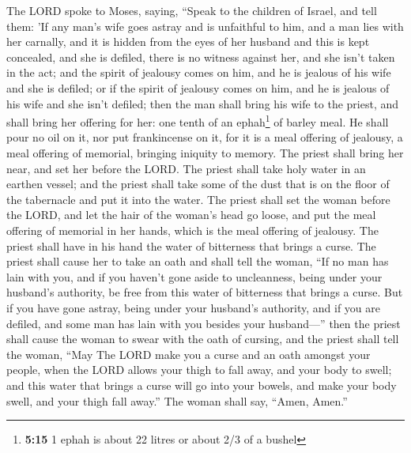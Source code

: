  The LORD spoke to Moses, saying,  ``Speak
to the children of Israel, and tell them: 'If any man's wife goes astray
and is unfaithful to him,  and a man lies with her
carnally, and it is hidden from the eyes of her husband and this is kept
concealed, and she is defiled, there is no witness against her, and she
isn't taken in the act;  and the spirit of jealousy comes
on him, and he is jealous of his wife and she is defiled; or if the
spirit of jealousy comes on him, and he is jealous of his wife and she
isn't defiled;  then the man shall bring his wife to the
priest, and shall bring her offering for her: one tenth of an
ephah\footnote{\textbf{5:15} 1 ephah is about 22 litres or about 2/3 of
  a bushel} of barley meal. He shall pour no oil on it, nor put
frankincense on it, for it is a meal offering of jealousy, a meal
offering of memorial, bringing iniquity to memory.  The
priest shall bring her near, and set her before the LORD.
 The priest shall take holy water in an earthen vessel;
and the priest shall take some of the dust that is on the floor of the
tabernacle and put it into the water.  The priest shall
set the woman before the LORD, and let the hair of the woman's head go
loose, and put the meal offering of memorial in her hands, which is the
meal offering of jealousy. The priest shall have in his hand the water
of bitterness that brings a curse.  The priest shall
cause her to take an oath and shall tell the woman, ``If no man has lain
with you, and if you haven't gone aside to uncleanness, being under your
husband's authority, be free from this water of bitterness that brings a
curse.  But if you have gone astray, being under your
husband's authority, and if you are defiled, and some man has lain with
you besides your husband---''  then the priest shall
cause the woman to swear with the oath of cursing, and the priest shall
tell the woman, ``May The LORD make you a curse and an oath amongst your
people, when the LORD allows your thigh to fall away, and your body to
swell;  and this water that brings a curse will go into
your bowels, and make your body swell, and your thigh fall away.'' The
woman shall say, ``Amen, Amen.''

